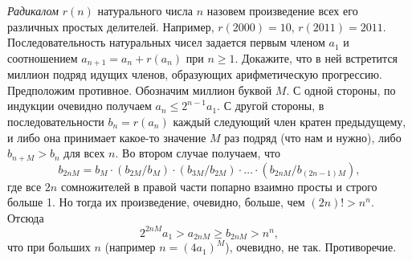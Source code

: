 \problem
\emph{Радикалом} $r(n)$ натурального числа $n$ назовем произведение всех его
различных простых делителей.
Например, $r(2000) = 10$, $r(2011) = 2011$.
Последовательность натуральных чисел задается первым членом $a_1$ и
соотношением $a_{n + 1} = a_n + r(a_n)$ при $n \geq 1$.
Докажите, что в ней встретится миллион подряд идущих членов, образующих
арифметическую прогрессию.
\solution
Предположим противное.
Обозначим миллион буквой $M$.
С одной стороны, по индукции очевидно получаем $a_n \leq 2^{n - 1} a_1$.
С другой стороны, в последовательности $b_n = r(a_n)$ каждый следующий член
кратен предыдущему, и либо она принимает какое-то значение $M$ раз подряд
(что нам и нужно), либо $b_{n + M} > b_{n}$ для всех $n$.
Во втором случае получаем, что
\[
    b_{2 n M}
=
    b_M \cdot (b_{2 M} / b_M) \cdot (b_{3 M} / b_{2 M})
    \cdot \ldots \cdot
    (b_{2 n M} / b_{(2 n - 1) M})
,\]
где все $2 n$ сомножителей в правой части попарно взаимно просты и строго
больше 1.
Но тогда их произведение, очевидно, больше, чем $(2 n)! > n^n$.
Отсюда 
\[
    2^{2 n M} a_1
>
    a_{2 n M}
\geq
    b_{2 n M}
>
    n^n
,\]
что при больших $n$ (например $n = (4 a_1)^M$), очевидно, не так.
Противоречие.
\endproblem
